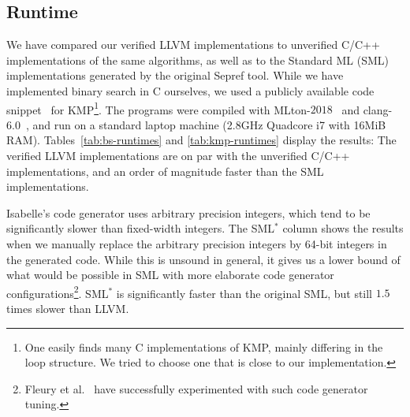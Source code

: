 \documentclass[a4paper,USenglish,cleveref, autoref]{lipics-v2019}
\begin{document}
\subsection{Runtime}
We have compared our verified LLVM implementations to unverified C/C++ implementations of the same algorithms, 
as well as to the Standard ML (SML) implementations generated by the original Sepref tool. 
While we have implemented binary search in C ourselves, we used a publicly available code snippet~\cite{kmp_cpp} for 
KMP\footnote{One easily finds many C implementations of KMP, mainly differing in the loop structure. We tried to choose one that is close to our implementation.}.
The programs were compiled with MLton-$2018$~\cite{MLton} and clang-$6.0$~\cite{clang}, and run on a standard laptop machine (2.8GHz Quadcore i7 with 16MiB RAM).
%
Tables~\ref{tab:bs-runtimes} and \ref{tab:kmp-runtimes} display the 
results: The verified LLVM implementations are on par with the unverified C/C++ implementations, and an order of magnitude faster 
than the SML implementations. 

Isabelle's code generator uses arbitrary precision integers, which tend to be significantly slower than fixed-width integers.
The SML${}^*$ column shows the results when we manually replace the arbitrary precision integers by 64-bit integers in the generated code.
While this is unsound in general, it gives us a lower bound of what would be possible in SML with 
more elaborate code generator configurations\footnote{Fleury et al.~\cite{FBL18} have successfully experimented with such code generator tuning.}.
SML${}^*$ is significantly faster than the original SML, but still $1.5$ times slower than LLVM.
\end{document}
